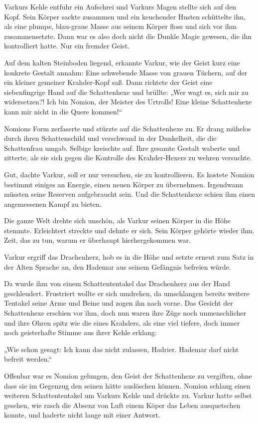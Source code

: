 Varkurs Kehle entfuhr ein Aufschrei und Varkurs Magen stellte sich auf den Kopf. Sein Körper sackte zusammen und ein keuchender Husten schüttelte ihn, als eine plumpe, blau-graue Masse aus seinem Körper floss und sich vor ihm zusammensetzte. Dann war es also doch nicht die Dunkle Magie gewesen, die ihn kontrolliert hatte. Nur ein fremder Geist.

Auf dem kalten Steinboden liegend, erkannte Varkur, wie der Geist kurz eine konkrete Gestalt annahm: Eine schwebende Masse von grauen Tüchern, auf der ein kleiner gemeiner Krahder-Kopf saß. Dann richtete der Geist eine siebenfingrige Hand auf die Schattenhexe und brüllte: „Wer wagt es, sich mir zu widersetzen?! Ich bin Nomion, der Meister des Urtrolls! Eine kleine Schattenhexe kann mir nicht in die Quere kommen!“

Nomions Form zerfaserte und stürzte auf die Schattenhexe zu. Er drang mühelos durch ihren Schattenschild und verschwand in der Dunkelheit, die die Schattenfrau umgab. Selbige kreischte auf. Ihre gesamte Gestalt waberte und zitterte, als sie sich gegen die Kontrolle des Krahder-Hexers zu wehren versuchte.

Gut, dachte Varkur, soll er nur versuchen, sie zu kontrollieren. Es kostete Nomion bestimmt einiges an Energie, einen neuen Körper zu übernehmen. Irgendwann müssten seine Reserven aufgebraucht sein. Und die Schattenhexe schien ihm einen angemessenen Kampf zu bieten.

Die ganze Welt drehte sich unschön, als Varkur seinen Körper in die Höhe stemmte. Erleichtert streckte und dehnte er sich. Sein Körper gehörte wieder ihm. Zeit, das zu tun, warum er überhaupt hierhergekommen war.

Varkur ergriff das Drachenherz, hob es in die Höhe und setzte erneut zum Satz in der Alten Sprache an, den Hademar aus seinem Gefängnis befreien würde.

Da wurde ihm von einem Schattententakel das Drachenherz aus der Hand geschleudert. Frustriert wollte er sich umdrehen, da umschlangen bereits weitere Tentakel seine Arme und Beine und zogen ihn nach vorne. Das Gesicht der Schattenhexe erschien vor ihm, doch nun waren ihre Züge noch unmenschlicher und ihre Ohren spitz wie die eines Krahders, als eine viel tiefere, doch immer noch geisterhafte Stimme aus ihrer Kehle erklang:

„Wie schon gesagt: Ich kann das nicht zulassen, Hadrier. Hademar darf nicht befreit werden.“

Offenbar war es Nomion gelungen, den Geist der Schattenhexe zu vergiften, ohne dass sie im Gegenzug den seinen hätte auslöschen können. Nomion schlang einen weiteren Schattententakel um Varkurs Kehle und drückte zu. Varkur hatte selbst gesehen, wie rasch die Absenz von Luft einem Köper das Leben ausquetschen konnte, und haderte nicht lange mit einer Antwort.

